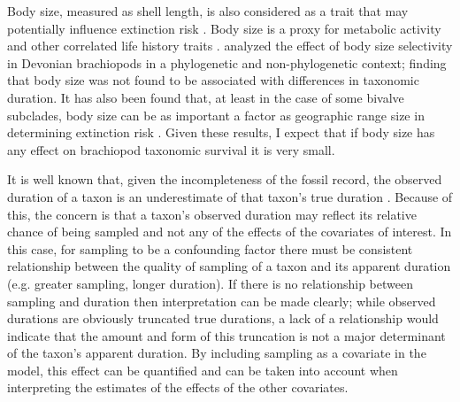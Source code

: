\documentclass[11pt]{article}
\begin{document}
Body size, measured as shell length, is also considered as a trait that may potentially influence extinction risk \citep{Payne2014,Harnik2011}. Body size is a proxy for metabolic activity and other correlated life history traits \citep{Payne2014}. \citet{Harnik2014} analyzed the effect of body size selectivity in Devonian brachiopods in a phylogenetic and non-phylogenetic context; finding that body size was not found to be associated with differences in taxonomic duration. It has also been found that, at least in the case of some bivalve subclades, body size can be as important a factor as geographic range size in determining extinction risk \citep{Harnik2011}. Given these results, I expect that if body size has any effect on brachiopod taxonomic survival it is very small.

It is well known that, given the incompleteness of the fossil record, the observed duration of a taxon is an underestimate of that taxon's true duration \citep{Solow1997,Wagner2013a,Wang2004,Liow2010b,Alroy2014a,Foote1996e}. Because of this, the concern is that a taxon's observed duration may reflect its relative chance of being sampled and not any of the effects of the covariates of interest. In this case, for sampling to be a confounding factor there must be consistent relationship between the quality of sampling of a taxon and its apparent duration (e.g. greater sampling, longer duration). If there is no relationship between sampling and duration then interpretation can be made clearly; while observed durations are obviously truncated true durations, a lack of a relationship would indicate that the amount and form of this truncation is not a major determinant of the taxon's apparent duration. By including sampling as a covariate in the model, this effect can be quantified and can be taken into account when interpreting the estimates of the effects of the other covariates.
\end{document}
